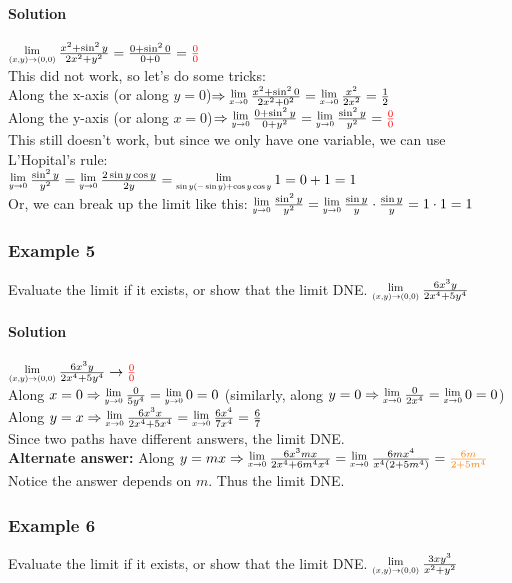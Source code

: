 \documentclass{article}
\newcommand{\Lim}[1]{\raisebox{0.5ex}{\scalebox{0.8}{$\displaystyle \lim_{#1}\;$}}}
\begin{document}
\paragraph{Solution} $\Lim{(x,y)\to(0,0)}\frac{x^2+\sin^2y}{2x^2+y^2}=\frac{0+\sin^20}{0+0}=\textcolor{red}{\frac{0}{0}}$
\\This did not work, so let's do some tricks:
\\Along the x-axis (or along $y=0$)$\Rightarrow\Lim{x\to0}\frac{x^2+\sin^20}{2x^2+0^2}=\Lim{x\to0}\frac{x^2}{2x^2}=\frac{1}{2}$
\\Along the y-axis (or along $x=0$)$\Rightarrow\Lim{y\to0}\frac{0+\sin^2y}{0+y^2}=\Lim{y\to0}\frac{\sin^2y}{y^2}=\textcolor{red}{\frac{0}{0}}$
\\This still doesn't work, but since we only have one variable, we can use L'Hopital's rule:
\\$\Lim{y\to0}\frac{\sin^2y}{y^2}=\Lim{y\to0}\frac{2\sin{y}\cos{y}}{2y}=\Lim{\sin{y}(-\sin{y})+\cos{y}\cos{y}}{1}=0+1=1$
\\Or, we can break up the limit like this: $\Lim{y\to0}\frac{\sin^2y}{y^2}=\Lim{y\to0}\frac{\sin{y}}{y}\cdot\frac{\sin{y}}{y}=1\cdot1=1$

\subsubsection{Example 5}
Evaluate the limit if it exists, or show that the limit DNE. $\Lim{(x,y)\to(0,0)}\frac{6x^3y}{2x^4+5y^4}$
\paragraph{Solution} $\Lim{(x,y)\to(0,0)}\frac{6x^3y}{2x^4+5y^4}\rightarrow\textcolor{red}{\frac{0}{0}}$
\\Along $x=0\Rightarrow\Lim{y\to0}\frac{0}{5y^4}=\Lim{y\to0}0=0$ (similarly, along $y=0\Rightarrow\Lim{x\to0}\frac{0}{2x^4}=\Lim{x\to0}0=0$)
\\Along $y=x\Rightarrow\Lim{x\to0}\frac{6x^3x}{2x^4+5x^4}=\Lim{x\to0}\frac{6x^4}{7x^4}=\frac{6}{7}$
\\Since two paths have different answers, the limit DNE.
\\\textbf{Alternate answer:} Along $y=mx\Rightarrow\Lim{x\to0}\frac{6x^3mx}{2x^4+6m^4x^4}=\Lim{x\to0}\frac{6mx^4}{x^4(2+5m^4)}=\textcolor{orange}{\frac{6m}{2+5m^4}}$
\\Notice the answer depends on $m$. Thus the limit DNE.

\subsubsection{Example 6}
Evaluate the limit if it exists, or show that the limit DNE. $\Lim{(x,y)\to(0,0)}\frac{3xy^3}{x^2+y^2}$
\end{document}
